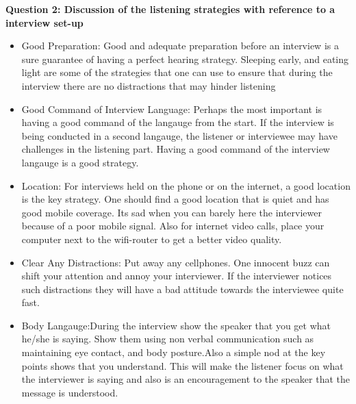 \documentclass[12pt, a4]{article}
\begin{document}
\textbf{Question 2: Discussion of the listening strategies with reference to a interview set-up}
\begin{itemize}
  
\item{Good Preparation: Good and adequate preparation before an interview is a
    sure guarantee of having a perfect hearing strategy. Sleeping early, and
    eating light are some of the strategies that one can use to ensure that
    during the interview there are no distractions that may hinder listening}

\item{Good Command of Interview Language: Perhaps the most important is having a good
    command of the langauge from the start. If the interview is being conducted
    in a second langauge, the listener or interviewee may have challenges in the
    listening part. Having a good command of the interview langauge is a good strategy.}

\item{Location: For interviews held on the phone or on the internet, a good
    location is the key strategy. One should find a good location that is quiet
    and has good mobile coverage. Its sad when you can barely here the
    interviewer because of a poor mobile signal. Also for internet video calls,
    place your computer next to the wifi-router to get a better video quality.  }

\item{Clear Any Distractions: Put away any cellphones. One innocent buzz can
    shift your attention and annoy your interviewer. If the interviewer notices
    such distractions they will have a bad attitude towards the interviewee
    quite fast.}

\item{Body Langauge:During the interview show the speaker that you get what
    he/she is saying. Show them using non verbal communication such as
    maintaining eye contact, and body posture.Also a simple nod at the key
    points shows that you understand. This will make the listener focus on
    what the interviewer is saying and also is an encouragement to the speaker
    that the message is understood.}

\end{itemize}
\end{document}
